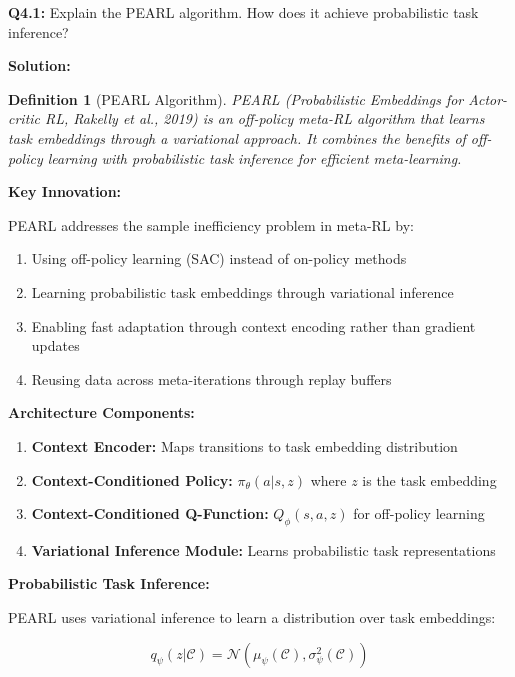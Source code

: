 \documentclass[12pt]{article}
\newcommand{\ieee}[1]{\textcolor{IEEEBlue}{\textbf{#1}}}
\newtheorem{definition}{Definition}
\begin{document}
{{			\textbf{Q4.1:} Explain the PEARL algorithm. How does it achieve probabilistic task inference?
			
			\textbf{Solution:}
			
			\begin{definition}[PEARL Algorithm]
			PEARL (Probabilistic Embeddings for Actor-critic RL, Rakelly et al., 2019) is an off-policy meta-RL algorithm that learns task embeddings through a variational approach. It combines the benefits of off-policy learning with probabilistic task inference for efficient meta-learning.
			\end{definition}
			
			\ieee{Key Innovation:}
			
			PEARL addresses the sample inefficiency problem in meta-RL by:
			
			\begin{enumerate}
				\item Using off-policy learning (SAC) instead of on-policy methods
				\item Learning probabilistic task embeddings through variational inference
				\item Enabling fast adaptation through context encoding rather than gradient updates
				\item Reusing data across meta-iterations through replay buffers
			\end{enumerate}
			
			\ieee{Architecture Components:}
			
			\begin{enumerate}
				\item \textbf{Context Encoder:} Maps transitions to task embedding distribution
				\item \textbf{Context-Conditioned Policy:} $\pi_\theta(a|s, z)$ where $z$ is the task embedding
				\item \textbf{Context-Conditioned Q-Function:} $Q_\phi(s, a, z)$ for off-policy learning
				\item \textbf{Variational Inference Module:} Learns probabilistic task representations
			\end{enumerate}
			
			\ieee{Probabilistic Task Inference:}
			
			PEARL uses variational inference to learn a distribution over task embeddings:
			
			\begin{equation}
			q_\psi(z|\mathcal{C}) = \mathcal{N}(\mu_\psi(\mathcal{C}), \sigma_\psi^2(\mathcal{C}))
			\end{equation}
			
}}
\end{document}
